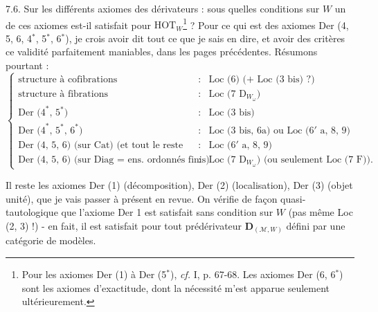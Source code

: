 \documentclass[11pt]{article}
\newcommand{\printedpage}[1]{\marginpar{\footnotesize p.~#1}}
\newcommand{\msp}[1]{\marginpar{\footnotesize [#1]}}
\begin{document}
\printedpage{52}
7.6. Sur les différents axiomes des dérivateurs : sous quelles conditions sur $W$ un de ces axiomes est-il satisfait pour $\mathrm{HOT}_W$\footnote[51]{Pour les axiomes Der (1) à Der (5$^*$), \textit{cf.} I, p. 67-68. Les axiomes Der (6, 6$^*$) sont les axiomes d'exactitude, dont la nécessité m'est apparue seulement ultérieurement.} ? Pour ce qui est des axiomes Der (4, 5, 6, 4$^*$, 5$^*$, 6$^*$), je crois avoir dit tout ce que je sais en dire, et avoir des critères ce validité parfaitement maniables, dans les pages précédentes. Résumons pourtant : %
\[
\left\{
\begin{array}{lcl}
\text{structure à cofibrations} & : & \text{Loc (6) (+ Loc (3 bis) ?)} \\[1ex]
\text{structure à fibrations} & : & \text{Loc (7 }\mathrm{D}_{W_\omega}\text{)} \\[1ex]
\text{Der (4}^*\text{, 5}^*\text{)} & : & \text{Loc (3 bis)} \\[1ex]
\text{Der (4}^*\text{, 5}^*\text{, 6}^*\text{)} & : & \text{Loc (3 bis, 6a) ou Loc (6}'\text{ a, 8, 9)} \\[1ex]
\text{Der (4, 5, 6) (sur Cat) (et tout le reste !)} & : & \text{Loc (6}'\text{ a, 8, 9)} \\[1ex]
\text{Der (4, 5, 6) (sur Diag $=$ ens. ordonnés finis)} & : & \text{Loc (7 }\mathrm{D}_{W_\omega}\text{) (ou seulement Loc (7 F)).}
\end{array}
\right.
\]

Il reste les axiomes Der (1) (décomposition), Der (2) (localisation), Der (3) (objet unité), que je vais passer à présent en revue. On vérifie
\msp{page 109}
de façon quasi-tautologique que l'axiome Der 1 est satisfait sans condition sur $W$ (pas même Loc (2, 3) !) - en fait, il est satisfait pour tout prédérivateur $\mathbf{D}_{(\mathcal{M},W)}$ défini par une catégorie de modèles.
\end{document}
